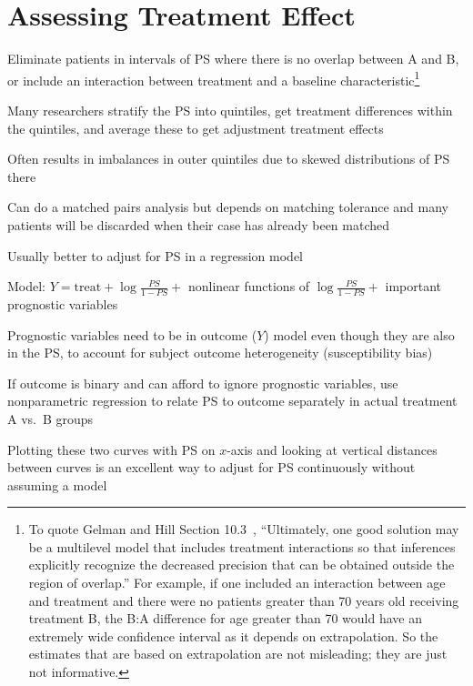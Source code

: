 \section{Assessing Treatment Effect}
\bi
\item Eliminate patients in intervals of PS where there is no overlap
  between A and B, or include an interaction between treatment and a
  baseline characteristic\footnote{To quote Gelman and
    Hill Section 10.3~\cite{gel06dat}, ``Ultimately, one good
    solution may be a multilevel model that includes treatment
    interactions so that inferences explicitly recognize the decreased
    precision that can be obtained outside the region of overlap.''  For example, if one included an interaction between age and treatment and there were no patients greater than 70 years old receiving treatment B, the B:A difference for age greater than 70 would have an extremely wide confidence interval as it depends on extrapolation.  So the estimates that are based on extrapolation are not misleading; they are just not informative.}
\item Many researchers stratify the PS into quintiles, get treatment
  differences within the quintiles, and average these to get
  adjustment treatment effects
\item Often results in imbalances in outer quintiles due to skewed
  distributions of PS there
\item Can do a matched pairs analysis but depends on matching
  tolerance and many patients will be discarded when their case has
  already been matched
\item Usually better to adjust for PS in a regression model
\item Model: $Y = \textrm{treat} + \log\frac{PS}{1-PS} +$
  nonlinear functions of $\log\frac{PS}{1-PS} +$ important prognostic
    variables
\item Prognostic variables need to be in outcome ($Y$) model even
  though they are also in the PS, to account for subject outcome heterogeneity
  (susceptibility bias)
\item If outcome is binary and can afford to ignore prognostic
  variables, use nonparametric regression to relate PS to outcome
  separately in actual treatment A vs.\ B groups
\item Plotting these two curves with PS on $x$-axis and looking at
  vertical distances between curves is an excellent
  way to adjust for PS continuously without assuming a model
\ei

